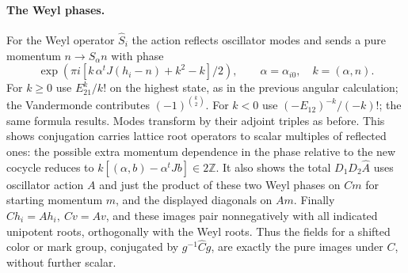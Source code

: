 \paragraph{The Weyl phases.} For the Weyl operator \(\widehat S_i\) the action reflects oscillator modes and sends a pure momentum \(n\to S_\alpha n\) with phase
\[
 \exp(\pi i[k\,\alpha^t J(h_i-n)+k^2-k]/2),
 \qquad \alpha=\alpha_{i0},\quad k=(\alpha,n).
\]
For \(k\ge0\) use \(E_{21}^k/k!\) on the highest state, as in the previous angular calculation; the Vandermonde contributes \((-1)^{\binom{k}{2}}\). For \(k<0\) use \((-E_{12})^{-k}/(-k)!\); the same formula results. Modes transform by their adjoint triples as before. This shows conjugation carries lattice root operators to scalar multiples of reflected ones: the possible extra momentum dependence in the phase relative to the new cocycle reduces to \(k[(\alpha,b)-\alpha^t J b]\in2\mathbb Z\). It also shows the total \(D_1D_2\widehat A\) uses oscillator action \(A\) and just the product of these two Weyl phases on \(Cm\) for starting momentum \(m\), and the displayed diagonals on \(A m\). Finally \(C h_i=A h_i,\ C v=A v\), and these images pair nonnegatively with all indicated unipotent roots, orthogonally with the Weyl roots. Thus the fields for a shifted color or mark group, conjugated by \(g^{-1}\widehat Cg\), are exactly the pure images under \(C\), without further scalar.

